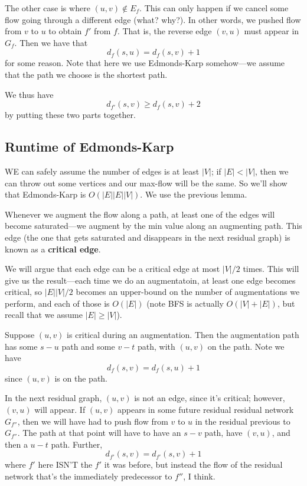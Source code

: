 \documentclass{article}
\begin{document}
The other case is where $(u,v) \not\in E_f$.
This can only happen if we cancel some flow going through a different edge
(what? why?).
In other words, we pushed flow from $v$ to $u$ to obtain $f'$ from $f$.
That is, the reverse edge $(v,u)$ must appear in $G_f$.
Then we have that 
$$
d_f(s,u) = d_f(s,v) + 1
$$
for some reason.
Note that here we use Edmonds-Karp somehow---we assume that the path we
choose is the shortest path.

We thus have 
$$
d_{f'}(s,v) \geq d_f(s,v) + 2
$$
by putting these two parts together.

\subsection{Runtime of Edmonds-Karp}

WE can safely assume the number of edges is at least $|V|$; if
$|E| < |V|$, then we can throw out some vertices and our max-flow will be the
same.
So we'll show that Edmonds-Karp is $O(|E| |E| |V|)$.
We use the previous lemma.

Whenever we augment the flow along a path, at least one of the edges will
become saturated---we augment by the min value along an augmenting path.
This edge (the one that gets saturated and disappears in the next
residual graph) is known as a \textbf{critical edge}.

We will argue that each edge can be a critical edge at most $|V|/2$ times.
This will give us the result---each time we do an augmentatoin, at least
one edge becomes critical, so $|E||V| / 2$ becomes an upper-bound
on the number of augmentations we perform, and each of those is $O(|E|)$
(note BFS is actually $O(|V| + |E|)$, but recall that we assume
 $|E| \geq |V|$).

Suppose $(u,v)$ is critical during an augmentation. 
Then the augmentation path has some $s-u$ path and some $v-t$ path, with
$(u,v)$ on the path.
Note we have
$$
d_f(s,v) = d_f(s,u) + 1
$$
since $(u,v)$ is on the path.

In the next residual graph, $(u,v)$ is not an edge, since it's critical;
however, $(v,u)$ will appear.
If $(u,v)$ appears in some future residual residual network $G_{f''}$,
then we will have had to push flow from $v$ to $u$ in the
residual previous to $G_{f''}$.
The path at that point will have to have an $s-v$ path, have $(v,u)$, and
then a $u-t$ path.
Further,
$$
d_{f'}(s,v) = d_{f'}(s,v) + 1
$$
where $f'$ here ISN'T the $f'$ it was before, but instead the flow of the
residual network that's the immediately predecessor to $f''$, I think.
\end{document}
